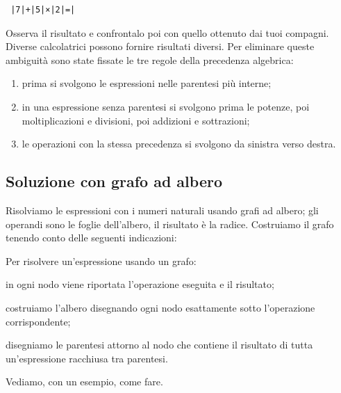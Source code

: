 \begin{verbatim}
 |7|+|5|×|2|=|
\end{verbatim} 

Osserva il risultato e confrontalo poi con quello ottenuto dai tuoi 
compagni.
Diverse calcolatrici possono fornire risultati diversi.
Per eliminare queste ambiguità sono state fissate le tre regole della 
precedenza algebrica:

\begin{enumerate}
 \item prima si svolgono le espressioni nelle parentesi più interne; 
 \item in una espressione senza parentesi si svolgono prima le potenze, 
  poi moltiplicazioni e divisioni, poi addizioni e sottrazioni;
 \item le operazioni con la stessa precedenza si svolgono da sinistra verso 
  destra.
\end{enumerate}

\subsection{Soluzione con grafo ad albero}

Risolviamo le espressioni con i numeri naturali usando grafi ad albero;
gli operandi sono le foglie dell'albero, il risultato è la radice. 
Costruiamo il grafo tenendo conto delle seguenti indicazioni:

\begin{procedura}
 Per risolvere un'espressione usando un grafo:
\begin{enumerate*}
 \item in ogni nodo viene riportata l'operazione eseguita e il risultato;
 \item costruiamo l'albero disegnando ogni nodo esattamente sotto
  l'operazione corrispondente;
 \item disegniamo le parentesi attorno al nodo che contiene il
  risultato di tutta un'espressione racchiusa tra parentesi.
\end{enumerate*}
\end{procedura}

Vediamo, con un esempio, come fare.

